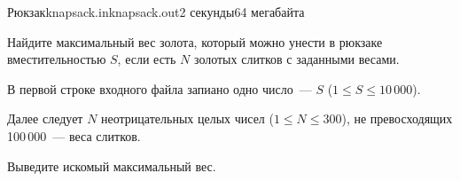 \documentclass[12pt,a4paper,oneside,twocolumn,landscape]{article}
\begin{document}
\raggedbottom

\begin{problem}{Рюкзак}{knapsack.in}{knapsack.out}{2 секунды}{64 мегабайта}{}
\graphicspath{{.././statements/}}


Найдите максимальный вес золота, который можно унести в рюкзаке вместительностью $S$, если есть $N$ золотых слитков с заданными весами.



\InputFile
В первой строке входного файла запиано одно число~--- $S$ ($1 \leqslant S \leqslant 10\,000$). 

Далее следует $N$ неотрицательных целых чисел ($1 \leqslant N \leqslant 300$), не превосходящих 100\,000~--- веса слитков.

\OutputFile
Выведите искомый максимальный вес.


\Examples

\begin{example}
%
%
\end{example}


\end{problem}
\end{document}
